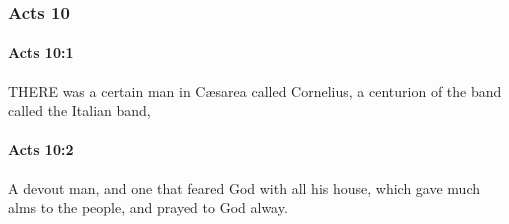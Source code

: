 	\subsubsection{Acts 10} %
		\label{ACTS-10}
		
		\paragraph{Acts 10:1} %
			\label{ACTS-10-1}

			THERE was a certain man in Cæsarea called Cornelius, a centurion of the band called the Italian band,

			\begin{framed}
			\scriptsize
				\begin{compactdesc}
					\item[SBLG] 
				\end{compactdesc}
			\end{framed}

		\paragraph{Acts 10:2} %
			\label{ACTS-10-2}

			A devout man, and one that feared God with all his house, which gave much alms to the people, and prayed to God alway.

